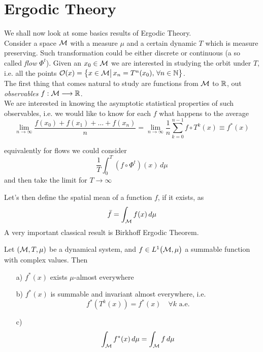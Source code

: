 \section{Ergodic Theory}
We shall now look at some basics results of Ergodic Theory.
\\Consider a space $\mathcal{M}$ with a measure $\mu$ and a certain dynamic $T$ which is measure preserving. Such transformation could be either discrete or continuous (a so called \textit{flow} $\Phi^t$). Given an $x_0 \in \mathcal{M}$ we are interested in studying the orbit under $T$, i.e. all the points $\mathcal{O}(x) = \big\{ x \in \mathcal{M} \big| \, x_n = T^n(x_0), \, \forall n \in \mathbb{N} \big\}$. 
\\The first thing that comes natural to study are functions from $\mathcal{M} $ to $\mathbb{R}$, out \textit{observables} $f: \mathcal{M} \longrightarrow \mathbb{R}$. 
\\We are interested in knowing the asymptotic statistical properties of such observables, i.e. we would like to know for each $f$ what happens to the average
\begin{equation*}
    \lim_{n \rightarrow \infty} \frac{f(x_0) + f(x_1) + \dots + f(x_n)}{n} = \lim_{n \rightarrow \infty} \frac{1}{n} \sum_{k=0}^{n-1} f \circ T^k(x) \equiv f^*(x)
\end{equation*} 
\begin{remark}
    equivalently for flows we could consider 
    \begin{equation}
        \frac{1}{T} \int_0^T (f \circ \Phi^t) (x) \, d\mu
    \end{equation}
    and then take the limit for $T \rightarrow \infty$
\end{remark}
Let's then define the spatial mean of a function $f$, if it exists, as 
\begin{equation}
    \Bar{f} = \int_{\mathcal{M}} f(x) \, d\mu
\end{equation}
A very important classical result is Birkhoff Ergodic Theorem.
\begin{theorem}
    Let $(\mathcal{M}, T, \mu)$ be a dynamical system, and $f \in L^1 \big( \mathcal{M}, \mu \big)$ a summable function with complex values. Then 
    \begin{itemize}
        \item[a)] $f^* (x)$ exists $\mu$-almost everywhere
        \item[b)] $f^* (x)$ is summable and invariant almost everywhere, i.e. 
        \begin{equation*}
            f^* (T^k (x) ) = f^*(x) \quad \forall k \, \, \text{a.e.}
        \end{equation*}
        \item[c)] 
        \begin{equation*}
            \int_{\mathcal{M}} f^*(x) \, d\mu = \int_{\mathcal{M}} f \, d\mu
        \end{equation*}
    \end{itemize}
\end{theorem}
